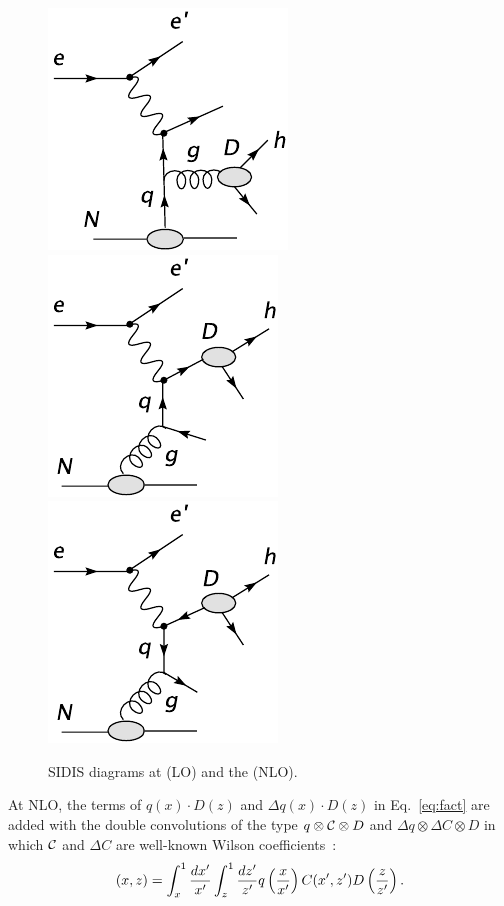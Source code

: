 \begin{figure}[htbp]
\includegraphics[width=0.24\linewidth]{figs_xj/nlo_qg2.pdf}
~\hspace{0.1cm}
\includegraphics[width=0.24\linewidth]{figs_xj/nlo_gq1.pdf}
\includegraphics[width=0.24\linewidth]{figs_xj/nlo_gq2.pdf}
\caption{\label{fig:sidis} SIDIS diagrams at \lo (LO) and the \nlo (NLO).
}
\end{figure}
At NLO,  
the terms of $q(x)\cdot D(z)$ and $\Delta q(x) \cdot D(z)$ in Eq.~\ref{eq:fact} are added 
with the double convolutions of the type $q \otimes {\cal C} \otimes D$ and $\Delta q \otimes \Delta C \otimes D$
in which ${\cal C}$ and $\Delta C$ are well-known Wilson coefficients~\cite{wilson}: 
 \begin{eqnarray}
  [q \otimes C \otimes D](x,z)= \int_x^1 { dx^\prime \over x^\prime} \int_z^1 {d z^\prime \over z^\prime}
 q \left( {x \over x^\prime} \right) C(x^\prime, z^\prime) D \left( {z \over z^\prime} \right).
\label{eq:nlo}  
\end{eqnarray}
 
